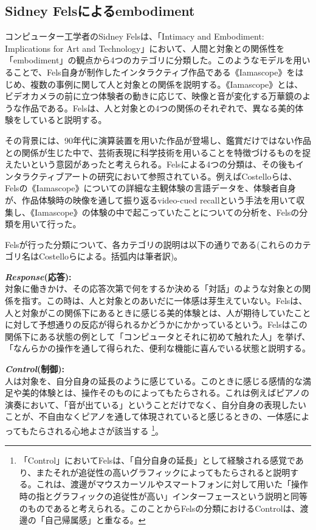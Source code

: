 \subsection{Sidney Felsによるembodiment}
コンピューター工学者のSidney Felsは、「Intimacy and Embodiment: Implications for Art and Technology」\cite{Fels}において、人間と対象との関係性を「embodiment」の観点から4つのカテゴリに分類した。このようなモデルを用いることで、Fels自身が制作したインタラクティブ作品である《Iamascope》をはじめ、複数の事例に関して人と対象との関係を説明する。《Iamascope》とは、ビデオカメラの前に立つ体験者の動きに応じて、映像と音が変化する万華鏡のような作品である。Felsは、人と対象との4つの関係のそれぞれで、異なる美的体験をしていると説明する。

その背景には、90年代に演算装置を用いた作品が登場し、鑑賞だけではない作品との関係が生じた中で、芸術表現に科学技術を用いることを特徴づけるものを捉えたいという意図があったと考えられる。Felsによる4つの分類は、その後もインタラクティブアートの研究において参照されている。例えばCostelloらは、Felsの《Iamascope》についての詳細な主観体験の言語データを、体験者自身が、作品体験時の映像を通して振り返るvideo-cued recallという手法を用いて収集し、《Iamascope》の体験の中で起こっていたことについての分析を、Felsの分類を用いて行った。

Felsが行った分類について、各カテゴリの説明は以下の通りである(これらのカテゴリ名はCostelloら\cite{Costello2005}による。括弧内は筆者訳)。

\textbf{\textit{Response}(応答):}\\
対象に働きかけ、その応答次第で何をするか決める「対話」のような対象との関係を指す。この時は、人と対象とのあいだに一体感は芽生えていない。Felsは、人と対象がこの関係下にあるときに感じる美的体験とは、人が期待していたことに対して予想通りの反応が得られるかどうかにかかっているという。Felsはこの関係下にある状態の例として「コンピュータとそれに初めて触れた人」を挙げ、「なんらかの操作を通して得られた、便利な機能に喜んでいる状態と説明する。

\textbf{\textit{Control}(制御):}\\
人は対象を、自分自身の延長のように感じている。このときに感じる感情的な満足や美的体験とは、操作そのものによってもたらされる。これは例えばピアノの演奏において、「音が出ている」ということだけでなく、自分自身の表現したいことが、不自由なくピアノを通して体現されていると感じるときの、一体感によってもたらされる心地よさが該当する \footnote{「Control」においてFelsは、「自分自身の延長」として経験される感覚であり、またそれが追従性の高いグラフィックによってもたらされると説明する。これは、渡邊がマウスカーソルやスマートフォンに対して用いた「操作時の指とグラフィックの追従性が高い」インターフェースという説明と同等のものであると考えられる。このことからFelsの分類におけるControlは、渡邊の「自己帰属感」と重なる。}。

